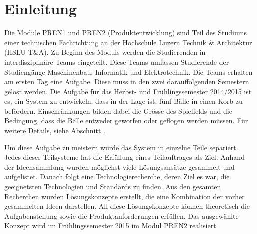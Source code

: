 \section{Einleitung}
Die Module PREN1 und PREN2 (Produktentwicklung) sind Teil des Studiums einer 
technischen Fachrichtung an der Hochschule Luzern Technik \& Architektur 
(HSLU T\&A). 
Zu Beginn des Moduls werden die Studierenden in interdisziplinäre Teams 
eingeteilt. Diese Teams umfassen Studierende der Studiengänge Maschinenbau, 
Informatik und Elektrotechnik. Die Teams erhalten am ersten Tag eine Aufgabe. 
Diese muss in den zwei darauffolgenden Semestern gelöst werden. 
Die Aufgabe für das Herbst- und Frühlingssemester 2014/2015 ist es, ein System zu entwickeln, dass in der Lage ist, fünf Bälle in einen Korb zu befördern. Einschränkungen bilden dabei die Grösse des Spielfelds und die Bedingung, dass die Bälle entweder geworfen oder geflogen werden müssen. 
Für weitere Details, siehe Abschnitt . 

Um diese Aufgabe zu meistern wurde das System in einzelne Teile separiert. Jedes dieser Teilsysteme hat die Erfüllung eines Teilauftrages als Ziel. Anhand der Ideensammlung wurden möglichst viele Lösungsansätze gesammelt und aufgelistet. Danach folgt eine Technologierecherche, deren Ziel es war, die geeignetsten Technologien und Standards zu finden. Aus den gesamten Recherchen wurden Lösungskonzepte erstellt, die eine Kombination der vorher gesammelten Ideen darstellen. All diese Lösungskonzepte können theoretisch die Aufgabenstellung sowie die Produktanforderungen erfüllen. Das ausgewählte Konzept wird im Frühlingssemester 2015 im Modul PREN2 realisiert.